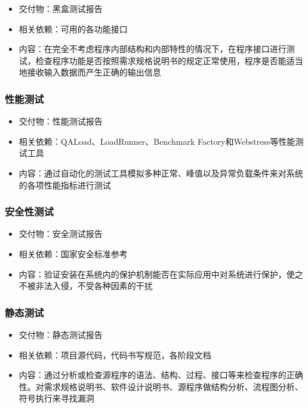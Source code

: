 \documentclass[hyperref, a4paper]{ctexart}
\providecommand{\tightlist}{%
  \setlength{\itemsep}{0pt}\setlength{\parskip}{0pt}}
\begin{document}
\begin{itemize}
\tightlist
\item
  交付物：黑盒测试报告
\item
  相关依赖：可用的各功能接口
\item
  内容：在完全不考虑程序内部结构和内部特性的情况下，在程序接口进行测试，检查程序功能是否按照需求规格说明书的规定正常使用，程序是否能适当地接收输入数据而产生正确的输出信息
\end{itemize}

\hypertarget{ux6027ux80fdux6d4bux8bd5}{%
\subsubsection{性能测试}\label{ux6027ux80fdux6d4bux8bd5}}

\begin{itemize}
\tightlist
\item
  交付物：性能测试报告
\item
  相关依赖：QALoad、LoadRunner、Benchmark
  Factory和Webstress等性能测试工具
\item
  内容：通过自动化的测试工具模拟多种正常、峰值以及异常负载条件来对系统的各项性能指标进行测试
\end{itemize}

\hypertarget{ux5b89ux5168ux6027ux6d4bux8bd5}{%
\subsubsection{安全性测试}\label{ux5b89ux5168ux6027ux6d4bux8bd5}}

\begin{itemize}
\tightlist
\item
  交付物：安全测试报告
\item
  相关依赖：国家安全标准参考
\item
  内容：验证安装在系统内的保护机制能否在实际应用中对系统进行保护，使之不被非法入侵，不受各种因素的干扰
\end{itemize}

\hypertarget{ux9759ux6001ux6d4bux8bd5}{%
\subsubsection{静态测试}\label{ux9759ux6001ux6d4bux8bd5}}

\begin{itemize}
\tightlist
\item
  交付物：静态测试报告
\item
  相关依赖：项目源代码，代码书写规范，各阶段文档
\item
  内容：通过分析或检查源程序的语法、结构、过程、接口等来检查程序的正确性。对需求规格说明书、软件设计说明书、源程序做结构分析、流程图分析、符号执行来寻找漏洞
\end{itemize}
\end{document}
